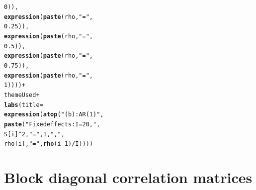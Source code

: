 \documentclass{article}\usepackage[]{graphicx}\usepackage[]{color}
\makeatletter
\newcommand{\hlnum}[1]{\textcolor[rgb]{0.686,0.059,0.569}{#1}}%
\newcommand{\hlstr}[1]{\textcolor[rgb]{0.192,0.494,0.8}{#1}}%
\newcommand{\hlopt}[1]{\textcolor[rgb]{0,0,0}{#1}}%
\newcommand{\hlstd}[1]{\textcolor[rgb]{0.345,0.345,0.345}{#1}}%
\newcommand{\hlkwc}[1]{\textcolor[rgb]{0.333,0.667,0.333}{#1}}%
\newcommand{\hlkwd}[1]{\textcolor[rgb]{0.737,0.353,0.396}{\textbf{#1}}}%
\newenvironment{kframe}{%
 \def\at@end@of@kframe{}%
 \ifinner\ifhmode%
  \def\at@end@of@kframe{\end{minipage}}%
  \begin{minipage}{\columnwidth}%
 \fi\fi%
 \def\FrameCommand##1{\hskip\@totalleftmargin \hskip-\fboxsep
 \colorbox{shadecolor}{##1}\hskip-\fboxsep
     \hskip-\linewidth \hskip-\@totalleftmargin \hskip\columnwidth}%
 \MakeFramed {\advance\hsize-\width
   \@totalleftmargin\z@ \linewidth\hsize
   \@setminipage}}%
 {\par\unskip\endMakeFramed%
 \at@end@of@kframe}
\newenvironment{knitrout}{}{} %
\makeatother
\begin{document}
\begin{knitrout}
\begin{kframe}
\begin{alltt}
                                            \hlnum{0}\hlstd{)),}
                           \hlkwd{expression}\hlstd{(}\hlkwd{paste}\hlstd{(rho,} \hlstr{"="}\hlstd{,}
                                            \hlnum{0.25}\hlstd{)),}
                           \hlkwd{expression}\hlstd{(}\hlkwd{paste}\hlstd{(rho,} \hlstr{"="}\hlstd{,}
                                            \hlnum{0.5}\hlstd{)),}
                           \hlkwd{expression}\hlstd{(}\hlkwd{paste}\hlstd{(rho,} \hlstr{"="}\hlstd{,}
                                            \hlnum{0.75}\hlstd{)),}
                           \hlkwd{expression}\hlstd{(}\hlkwd{paste}\hlstd{(rho,} \hlstr{"="}\hlstd{,}
                                            \hlnum{1}\hlstd{))))} \hlopt{+}
  \hlstd{themeUsed}\hlopt{+}
  \hlkwd{labs}\hlstd{(}\hlkwc{title}\hlstd{=}
         \hlkwd{expression}\hlstd{(}\hlkwd{atop}\hlstd{(}\hlstr{"(b): AR(1)"}\hlstd{,}
                         \hlkwd{paste}\hlstd{(}\hlstr{"Fixed effects: I = 20, "}\hlstd{,}
                               \hlstd{S[i]}\hlopt{^}\hlnum{2}\hlstd{,} \hlstr{" = "}\hlstd{,} \hlnum{1}\hlstd{,} \hlstr{", "}\hlstd{,}
                               \hlstd{rho[i],} \hlstr{" = "}\hlstd{,} \hlkwd{rho}\hlstd{(i}\hlopt{-}\hlnum{1}\hlstd{)}\hlopt{/}\hlstd{I))))}
\end{alltt}
\end{kframe}
\end{knitrout}

\section{Block diagonal correlation matrices}
\end{document}
